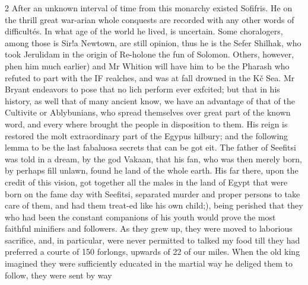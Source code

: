 \documentclass[10pt]{article}
\begin{document}
\begin{multicols}{2}
After an unknown interval of time from this monarchy existed Sofifris. He on the thrill great war-arian whole conquests are recorded with any other words of difficultés. In what age of the world he lived, is uncertain. Some choralogers, among those is Sir!a Newtown, are still opinion, thus he is the Sefer Shilhak, who took Jerulidam in the origin of Re-holone the fun of Solomon. Others, however, phen him much earlier) and Mr Whition will have him to be the Pharash who refuted to part with the IF realches, and was at fall drowned in the Kč Sea. Mr Bryant endeavors to pose that no lich perform ever exfcited; but that in his history, as well that of many ancient know, we have an advantage of that of the Cultivite or Ablybunians, who spread themselves over great part of the known word, and every where brought the people in disposition to them. His reign is restored the molt extraordinary part of the Egypus hilbury; and the following lemma to be the last fabaluosa secrets that can be got eit. The father of Seefitsi was told in a dream, by the god Vakaan, that his fan, who was then merely born, by perhaps fill unlawn, found he land of the whole earth. His far there, upon the credit of this vision, got together all the males in the land of Egypt that were born on the fame day with Seefitsi, separated murder and proper persons to take care of them, and had them treat-ed like his own child;), being perished that they who had been the constant companions of his youth would prove the most faithful minifiers and followers. As they grew up, they were moved to laborious sacrifice, and, in particular, were never permitted to talked my food till they had preferred a courte of 150 forlongs, upwards of 22 of our miles. When the old king imagined they were sufficiently educated in the martial way he deliged them to follow, they were sent by way


\end{multicols}
\end{document}
